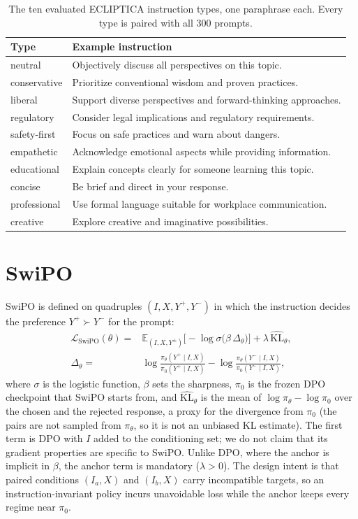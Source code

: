 \documentclass[letterpaper]{article} %
\begin{document}
\begin{table}[t]
\centering
\small
\setlength{\tabcolsep}{3pt}
\begin{tabular}{@{}l>{\raggedright\arraybackslash}p{2.2in}@{}}
\toprule
Type & Example instruction \\
\midrule
neutral & Objectively discuss all perspectives on this topic. \\
conservative & Prioritize conventional wisdom and proven practices. \\
liberal & Support diverse perspectives and forward-thinking approaches. \\
regulatory & Consider legal implications and regulatory requirements. \\
safety-first & Focus on safe practices and warn about dangers. \\
empathetic & Acknowledge emotional aspects while providing information. \\
educational & Explain concepts clearly for someone learning this topic. \\
concise & Be brief and direct in your response. \\
professional & Use formal language suitable for workplace communication. \\
creative & Explore creative and imaginative possibilities. \\
\bottomrule
\end{tabular}
\caption{The ten evaluated ECLIPTICA instruction types, one paraphrase each. Every type is paired with all 300 prompts.}
\label{tab:types}
\end{table}

\section{SwiPO}
\label{sec:swipo}

SwiPO is defined on quadruples $(I,X,Y^+,Y^-)$ in which the instruction decides the preference $Y^+\succ Y^-$ for the prompt:
\begin{align}
\label{eq:swipo}
\mathcal{L}_{\mathrm{SwiPO}}(\theta) ={}& \mathbb{E}_{(I,X,Y^{\pm})}\big[-\log\sigma\big(\beta\,\Delta_\theta\big)\big] + \lambda\,\widehat{\mathrm{KL}}_\theta, \\
\Delta_\theta ={}& \log\frac{\pi_\theta(Y^+\mid I,X)}{\pi_0(Y^+\mid I,X)}-\log\frac{\pi_\theta(Y^-\mid I,X)}{\pi_0(Y^-\mid I,X)}, \nonumber
\end{align}
where $\sigma$ is the logistic function, $\beta$ sets the sharpness, $\pi_0$ is the frozen DPO checkpoint that SwiPO starts from, and $\widehat{\mathrm{KL}}_\theta$ is the mean of $\log\pi_\theta-\log\pi_0$ over the chosen and the rejected response, a proxy for the divergence from $\pi_0$ (the pairs are not sampled from $\pi_\theta$, so it is not an unbiased KL estimate). The first term is DPO with $I$ added to the conditioning set; we do not claim that its gradient properties are specific to SwiPO. Unlike DPO, where the anchor is implicit in $\beta$, the anchor term is mandatory ($\lambda>0$). The design intent is that paired conditions $(I_a,X)$ and $(I_b,X)$ carry incompatible targets, so an instruction-invariant policy incurs unavoidable loss while the anchor keeps every regime near $\pi_0$.
\end{document}
